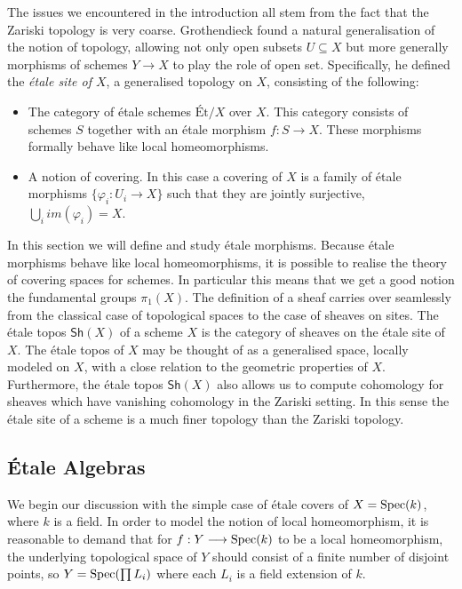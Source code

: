 The issues we encountered in the introduction all stem from the fact that the Zariski topology is very coarse. Grothendieck found a natural generalisation of the notion of topology, allowing not only open subsets $U \subseteq X$ but more generally morphisms of schemes $Y \to X$ to play the role of open set. Specifically, he defined the \textit{\'etale site of $X$}, a generalised topology on $X$, consisting of the following:

\begin{itemize}
  \item The category of \'etale schemes $\text{\'Et}/X$ over $X$. This category consists of schemes $S$ together with an \'etale morphism $f: S \to X$. These morphisms formally behave like local homeomorphisms. 
  \item A notion of covering. In this case a covering of $X$ is a family of \'etale morphisms $\{\varphi_i: U_i \to X\}$ such that they are jointly surjective, $\bigcup_i im(\varphi_i) = X$. 
\end{itemize}

In this section we will define and study \'etale morphisms.  Because \'etale morphisms behave like local homeomorphisms, it is possible to realise the theory of covering spaces for schemes. In particular this means that we get a good notion the fundamental groups $\pi_1(X)$. The definition of a sheaf carries over seamlessly from the classical case of topological spaces to the case of sheaves on sites. The \'etale topos $\mathsf{Sh}(X)$ of a scheme $X$ is the category of sheaves on the \'etale site of $X$.  The \'etale topos of $X$ may be thought of as a generalised space, locally modeled on $X$, with a close relation to the geometric properties of $X$.  Furthermore, the \'etale topos $\mathsf{Sh}(X)$ also allows us to compute cohomology for sheaves which have vanishing cohomology in the Zariski setting. In this sense the \'etale site of a scheme is a much finer topology than the Zariski topology.

\subsection{\'Etale Algebras}
We begin our discussion with the simple case of \'etale covers of $X = \operatorname{Spec}(k)$, where $k$ is a field. In order to model the notion of local homeomorphism, it is reasonable to demand that for $f: Y \longrightarrow \operatorname{Spec}(k)$ to be a local homeomorphism, the underlying topological space of $Y$ should consist of a finite number of disjoint points, so $Y = \operatorname{Spec}(\prod L_i)$ where each $L_i$ is a field extension of $k$. 

